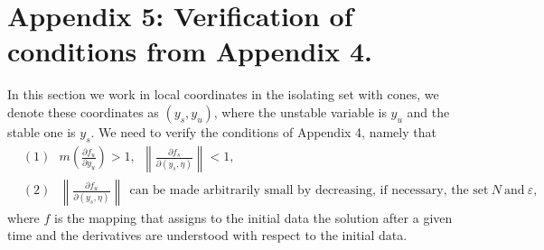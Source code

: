\documentclass[11pt, leqno]{amsart}
\theoremstyle{definition}
\begin{document}
\section{Appendix 5: Verification of conditions from Appendix 4.}
In this section we work in local coordinates in the isolating set with cones, we denote these coordinates as $(y_s,y_u)$, where the unstable variable is $y_u$ and the stable one is $y_s$. We need to verify the conditions of Appendix 4, namely that
\begin{align*}
	& (1)\ \ \ m\left(\frac{\partial f_u}{\partial y_u}\right) > 1,\ \  \left\|\frac{\partial f_s}{\partial (y_s,\eta)}\right\| < 1,\\
& (2) \ \ \ \left\|\frac{\partial f_u}{\partial (y_s,\eta)}\right\|\ \ \textrm{can be made arbitrarily small by decreasing, if necessary, the set}\ N\ \textrm{and}\ \varepsilon,
\end{align*}
where $f$ is the mapping that assigns to the initial data the solution after a given time and the derivatives are understood with respect to the initial data.
\end{document}

